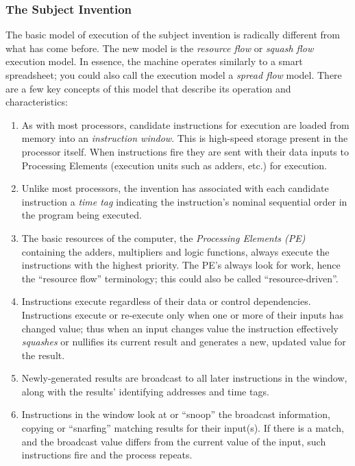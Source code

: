 \documentclass[10pt,dvips]{article}
\begin{document}
\subsubsection{The Subject Invention}
The basic model of execution of the subject invention is radically different
from what has come before. The new model is the {\it resource flow} or
{\it squash flow} execution model. In essence, the machine operates similarly to
a smart spreadsheet; you could also call the execution model
a {\it spread flow} model.
There are a few key concepts of
this model that describe its operation and characteristics:
\begin{enumerate}
\item As with most processors, candidate instructions for execution are loaded from
memory into an {\it instruction window}. This is high-speed storage present in the
processor itself. When instructions fire they are sent with their data inputs to
Processing Elements (execution units such as adders, etc.) for execution.

\item Unlike most processors, the invention has associated with each candidate
instruction a {\it time tag} indicating the instruction's nominal sequential order
in the program being executed.

\item The basic resources of the computer, the {\it Processing Elements (PE)}
containing the adders, multipliers and logic functions, always execute the
instructions with the highest priority. The PE's always look for work, hence
the ``resource flow'' terminology; this could also be called ``resource-driven''.

\item Instructions execute regardless of their data or control dependencies.
Instructions execute or re-execute only when one or more of their inputs has changed
value; thus when an input changes value the instruction effectively {\it squashes}
or nullifies its current result and generates a new, updated value for the result.

\item Newly-generated results are broadcast to all later instructions in the
window, along with the results' identifying addresses and time tags.

\item Instructions in the window look at or ``snoop'' the broadcast information,
copying or ``snarfing'' matching results for their input(s). If there is a match,
and the broadcast value differs from the current value of the input,
such instructions fire and the process repeats.
\end{enumerate}
\end{document}
